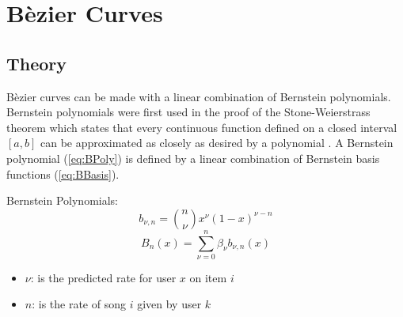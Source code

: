 \documentclass[12pt, letterpaper]{article}
\begin{document}
\section{B\`ezier Curves}
\subsection{Theory}
B\`ezier curves can be made with a linear combination of Bernstein polynomials. Bernstein polynomials were
first used in the proof of the Stone-Weierstrass theorem which states that every continuous function defined
on a closed interval $[a,b]$ can be approximated as closely as desired by a polynomial \citep{weierstrass}.
A Bernstein polynomial (\ref{eq:BPoly}) is defined by a linear combination of Bernstein basis functions
(\ref{eq:BBasis}).

Bernstein Polynomials:
\begin{equation}
  \label{eq:BBasis}
  b_{\nu,n} = {n \choose \nu} x^\nu (1 - x)^{\nu - n}
\end{equation}
\begin{equation}
  \label{eq:BPoly}
  B_n(x) = \sum_{\nu = 0}^{n}\beta_\nu b_{\nu,n} (x)
\end{equation}

\begin{small}
	\begin{singlespace}
		\begin{itemize}[label=]
    	\item $\nu$: is the predicted rate for user $x$ on item $i$
    	\item $n$: is the rate of song $i$ given by user $k$
		\end{itemize}
	\end{singlespace}
\end{small}
\end{document}
